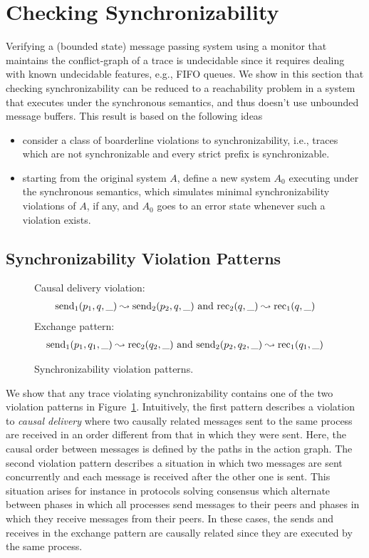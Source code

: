 \section{Checking Synchronizability}


Verifying a (bounded state) message passing system using a monitor that maintains the conflict-graph of a trace 
is undecidable since it requires dealing with known undecidable features, e.g., FIFO queues.
We show in this section that checking synchronizability can be reduced 
to a reachability problem in a system that executes under the synchronous semantics, and 
thus doesn't use unbounded message buffers. This result is based on the following ideas
\begin{itemize}
	\item consider a class of boarderline violations to synchronizability, i.e., traces which
are not synchronizable and every strict prefix is synchronizable.
	\item starting from the original system $A$, define a new system $A_0$ executing under
the synchronous semantics, which simulates minimal synchronizability violations of
$A$, if any, and $A_0$ goes to an error state whenever such a violation exists.
\end{itemize}

\subsection{Synchronizability Violation Patterns}


\begin{figure}[t]
Causal delivery violation:
\begin{align*}
\mathrm{send}_{1}({p_1,q,\_})\leadsto \mathrm{send}_{2}({p_2,q,\_})\mbox{ and }
 \mathrm{rec}_{2}({q,\_})  \leadsto \mathrm{rec}_{1}({q,\_})
\end{align*}
Exchange pattern:
\begin{align*}
\mathrm{send}_{1}({p_1,q_1,\_})\leadsto \mathrm{rec}_{2}({q_2,\_})\mbox{ and }
\mathrm{send}_{2}({p_2,q_2,\_})\leadsto \mathrm{rec}_{1}({q_1,\_})
\end{align*}
\caption{Synchronizability violation patterns.}
\label{fig:patterns}
\end{figure}

We show that any trace violating synchronizability contains one of the two violation patterns in Figure~\ref{fig:patterns}.
Intuitively, the first pattern describes a violation to \emph{causal delivery} where two causally related messages sent to the same process
are received in an order different from that in which they were sent. Here, the causal order between messages is defined
by the paths in the action graph. The second violation pattern describes a situation in which two messages are sent concurrently 
and each message is received after the other one is sent. This situation arises for instance in protocols solving consensus which alternate
between phases in which all processes send messages to their peers and phases in which they receive messages from their peers. 
In these cases, the sends and receives in the exchange pattern are causally related since they are executed by the same process.

